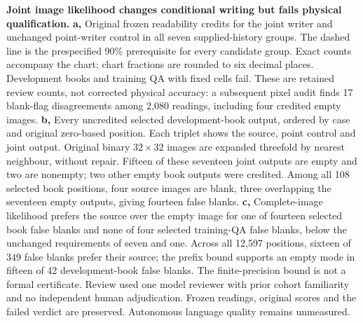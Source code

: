 \textbf{Joint image likelihood changes conditional writing but fails physical qualification.}
\textbf{a,} Original frozen readability credits for the joint writer and unchanged point-writer control in all seven supplied-history groups. The dashed line is the prespecified 90\% prerequisite for every candidate group. Exact counts accompany the chart; chart fractions are rounded to six decimal places. Development books and training QA with fixed cells fail. These are retained review counts, not corrected physical accuracy: a subsequent pixel audit finds 17 blank-flag disagreements among 2,080 readings, including four credited empty images. \textbf{b,} Every uncredited selected development-book output, ordered by case and original zero-based position. Each triplet shows the source, point control and joint output. Original binary $32\times32$ images are expanded threefold by nearest neighbour, without repair. Fifteen of these seventeen joint outputs are empty and two are nonempty; two other empty book outputs were credited. Among all 108 selected book positions, four source images are blank, three overlapping the seventeen empty outputs, giving fourteen false blanks. \textbf{c,} Complete-image likelihood prefers the source over the empty image for one of fourteen selected book false blanks and none of four selected training-QA false blanks, below the unchanged requirements of seven and one. Across all 12,597 positions, sixteen of 349 false blanks prefer their source; the prefix bound supports an empty mode in fifteen of 42 development-book false blanks. The finite-precision bound is not a formal certificate. Review used one model reviewer with prior cohort familiarity and no independent human adjudication. Frozen readings, original scores and the failed verdict are preserved. Autonomous language quality remains unmeasured.
